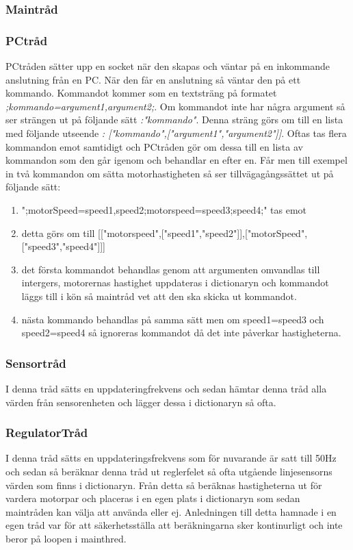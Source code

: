 \subsubsection{Maintråd}
\subsubsection{PCtråd}
PCtråden sätter upp en socket när den skapas och väntar på en inkommande anslutning från en PC. När den får en anslutning så väntar den på ett kommando. Kommandot kommer som en textsträng på formatet \textit{;kommando=argument1,argument2;}. Om kommandot inte har några argument så ser strängen ut på följande sätt \textit{:"kommando"}. Denna sträng görs om till en lista med följande utseende \textit{: ["kommando",["argument1","argument2"]]}.
\newline
\newline
Oftas tas flera kommandon emot samtidigt och PCtråden gör om dessa till en lista av kommandon som den går igenom och behandlar en efter en. Får men till exempel in två kommandon om sätta motorhastigheten så ser tillvägagångssättet ut på följande sätt:
\begin{enumerate}
\item ";motorSpeed=speed1,speed2;motorspeed=speed3;speed4;"  tas emot
\item detta görs om till [["motorspeed",["speed1","speed2"]],["motorSpeed",["speed3","speed4"]]]
\item det första kommandot behandlas genom att argumenten omvandlas till intergers, motorernas hastighet uppdateras i dictionaryn och kommandot läggs till i kön så maintråd vet att den ska skicka ut kommandot.
\item nästa kommando behandlas på samma sätt men om speed1=speed3 och speed2=speed4 så ignoreras kommandot då det inte påverkar hastigheterna.
\end{enumerate}
\subsubsection{Sensortråd}
I denna tråd sätts en uppdateringfrekvens och sedan hämtar denna tråd alla värden från sensorenheten och lägger dessa i dictionaryn så ofta.
\subsubsection{RegulatorTråd}
I denna tråd sätts en uppdateringsfrekvens som för nuvarande är satt till 50Hz och sedan så beräknar denna tråd ut reglerfelet så ofta utgående linjesensorns värden som finns i dictionaryn. Från detta så beräknas hastigheterna ut för vardera motorpar och placeras i en egen plats i dictionaryn som sedan maintråden kan välja att använda eller ej.
\newline
\newline
Anledningen till detta hamnade i en egen tråd var för att säkerhetsställa att beräkningarna sker kontinurligt och inte beror på loopen i mainthred.


